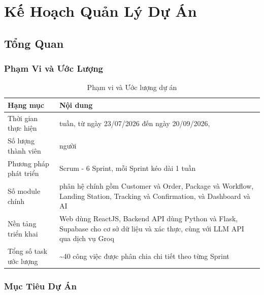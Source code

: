 \chapter{Kế Hoạch Quản Lý Dự Án}

\section{Tổng Quan}

\subsection{Phạm Vi và Ước Lượng}

\begin{table}[H]
  \centering
  \begin{tabularx}{\textwidth}{|l|>{\raggedright\arraybackslash}X|}
    \hline
    \textbf{Hạng mục} & \textbf{Nội dung} \\
    \hline
    Thời gian thực hiện & 8 tuần, từ ngày 23/07/2026 đến ngày 20/09/2026, \\ \hline
    Số lượng thành viên & 5 người \\ \hline
    Phương pháp phát triển & Scrum - 6 Sprint, mỗi Sprint kéo dài 1 tuần \\ \hline
    Số module chính & 5 phân hệ chính gồm Customer và Order, Package và Workflow, Landing Station, Tracking và Confirmation, và Dashboard và AI \\ \hline
    Nền tảng triển khai & Web dùng ReactJS, Backend API dùng Python và Flask, Supabase cho cơ sở dữ liệu và xác thực, cùng với LLM API qua dịch vụ Groq \\ \hline
    Tổng số task ước lượng & \textasciitilde{}40 công việc được phân chia chi tiết theo từng Sprint \\
    \hline
  \end{tabularx}
  \caption{Phạm vi và Ước lượng dự án}
  \label{tab:scope_estimation}
\end{table}

\subsection{Mục Tiêu Dự Án}

